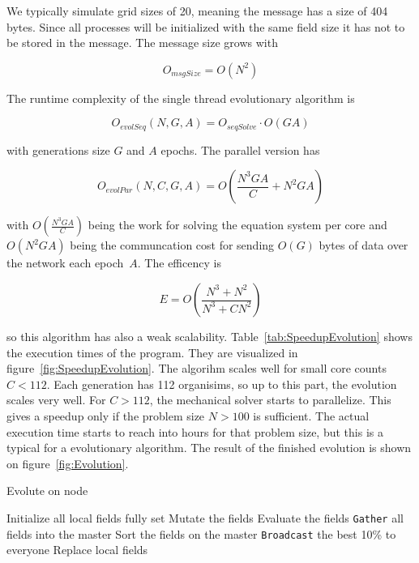 \documentclass[12pt]{article}
\begin{document}
We typically simulate grid sizes of 20, meaning the message has a size of 404 bytes. Since all processes will be initialized with the same field size it has not to be stored in the message. The message size grows with 

\begin{equation}
    O_{msgSize} = O(N^2)
\end{equation}

The runtime complexity of the single thread evolutionary algorithm is

\begin{equation}
    O_\mathit{evolSeq}(N, G, A) = O_\textit{seqSolve} \cdot O(G A)
\end{equation}

with generations size $G$ and $A$ epochs. The parallel version has

\begin{equation}
    O_\mathit{evolPar}(N, C, G, A) = O \left( \frac{N^3 G A}{C} + N^2 G A\right)
\end{equation}

with $O (\frac{N^3 G A}{C} )$ being the work for solving the equation system per core and $O(N^2 G A)$ being the communcation cost for sending $O(G)$ bytes of data over the network each epoch~$A$. The efficency is

\begin{equation}
    E = O \left(\frac{N^3 + N^2}{N^3+C N^2}\right)
\end{equation}

so this algorithm has also a weak scalability. Table~\ref{tab:SpeedupEvolution} shows the execution times of the program. They are visualized in figure~\ref{fig:SpeedupEvolution}. The algorihm scales well for small core counts $C < 112$. Each generation has 112 organisims, so up to this part, the evolution scales very well. For $C > 112$, the mechanical solver starts to parallelize. This gives a speedup only if the problem size $N > 100$ is sufficient. The actual execution time starts to reach into hours for that problem size, but this is a typical for a evolutionary algorithm. The result of the finished evolution is shown on figure~\ref{fig:Evolution}.


\begin{algorithm}[p]
    \caption{Evolute on node}
    \begin{algorithmic}
        \STATE Initialize all local fields fully set
            \STATE Mutate the fields
            \STATE Evaluate the fields
            \STATE \texttt{Gather} all fields into the master
            \STATE Sort the fields on the master
            \STATE \texttt{Broadcast} the best 10\% to everyone
            \STATE Replace local fields
        \ENDFOR
    \end{algorithmic}
    \label{alg:Evolution}
\end{algorithm}
\end{document}
